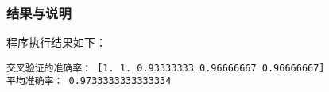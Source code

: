 \subsubsection{结果与说明}
程序执行结果如下：
\begin{lstlisting}[language=none]
交叉验证的准确率： [1. 1. 0.93333333 0.96666667 0.96666667]
平均准确率： 0.9733333333333334
\end{lstlisting}
